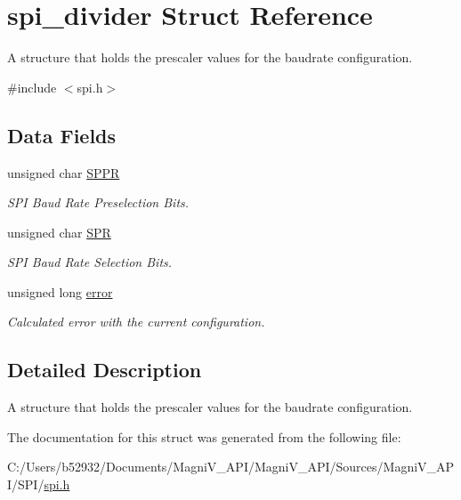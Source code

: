 \hypertarget{structspi__divider}{}\section{spi\+\_\+divider Struct Reference}
\label{structspi__divider}


A structure that holds the prescaler values for the baudrate configuration.  




{\ttfamily \#include $<$spi.\+h$>$}

\subsection*{Data Fields}
\begin{DoxyCompactItemize}
\item 
\hypertarget{structspi__divider_af58b6c6a0825768f7b077243dabcb927}{}unsigned char \hyperlink{structspi__divider_af58b6c6a0825768f7b077243dabcb927}{S\+P\+P\+R}\label{structspi__divider_af58b6c6a0825768f7b077243dabcb927}

\begin{DoxyCompactList}\small\item\em S\+P\+I Baud Rate Preselection Bits. \end{DoxyCompactList}\item 
\hypertarget{structspi__divider_a0221ade53a77657b6d3c33d1a0159182}{}unsigned char \hyperlink{structspi__divider_a0221ade53a77657b6d3c33d1a0159182}{S\+P\+R}\label{structspi__divider_a0221ade53a77657b6d3c33d1a0159182}

\begin{DoxyCompactList}\small\item\em S\+P\+I Baud Rate Selection Bits. \end{DoxyCompactList}\item 
\hypertarget{structspi__divider_a39faec1f329a576e1825641bfa7eaa4c}{}unsigned long \hyperlink{structspi__divider_a39faec1f329a576e1825641bfa7eaa4c}{error}\label{structspi__divider_a39faec1f329a576e1825641bfa7eaa4c}

\begin{DoxyCompactList}\small\item\em Calculated error with the current configuration. \end{DoxyCompactList}\end{DoxyCompactItemize}


\subsection{Detailed Description}
A structure that holds the prescaler values for the baudrate configuration. 



The documentation for this struct was generated from the following file\+:\begin{DoxyCompactItemize}
\item 
C\+:/\+Users/b52932/\+Documents/\+Magni\+V\+\_\+\+A\+P\+I/\+Magni\+V\+\_\+\+A\+P\+I/\+Sources/\+Magni\+V\+\_\+\+A\+P\+I/\+S\+P\+I/\hyperlink{spi_8h}{spi.\+h}\end{DoxyCompactItemize}
